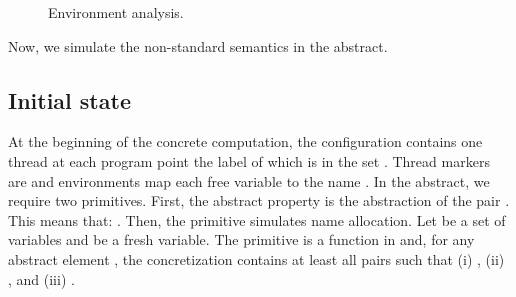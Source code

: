 \documentclass{article}
\begin{document}
\begin{figure*}[p]
\caption{Environment analysis.}
\label{abstractenv}
\end{figure*}


Now, we simulate the non-standard semantics in the abstract.
\subsection{Initial state}
At the beginning of the concrete computation, 
the configuration contains one thread at each program point the label of which is in the set . Thread markers are  and environments map each free variable  to the name . In the abstract, we require two primitives.
First, the abstract property  is the abstraction of the pair . This means that:  .
Then, the  primitive  simulates name allocation. 
Let  be a set of variables and  be a fresh variable. 
The primitive  is a function in  and, for any abstract element , 
the concretization  contains at least all pairs   such that (i) , (ii) , and (iii) .
\end{document}
